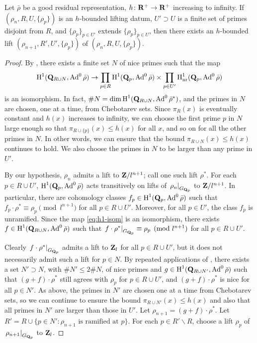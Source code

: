 \begin{theorem}\label{thm:lifting-datum}
Let $\bar\rho$ be a good residual representation, $h\colon \mathbf{R}^+ \to \mathbf{R}^+$ 
increasing to infinity. If $(\rho_n,R,U,\{\rho_p\})$ is an $h$-bounded lifting 
datum, $U'\supset U$ is a finite set of primes disjoint from $R$, and 
$\{\rho_p\}_{p\in U'}$ extends $\{\rho_p\}_{p\in U}$, then there exists an 
$h$-bounded lift $(\rho_{n+1},R',U',\{\rho_p\})$ of 
$(\rho_n,R,U,\{\rho_p\})$. 
\end{theorem}
\begin{proof}
By \cite[Lem.~8]{khare-larsen-ramakrishna-2005}, there exists a finite set 
$N$ of nice primes such that the map 
\begin{equation}\label{eq:h1-isom}
	\operatorname{H}^1(\mathbf{Q}_{R\cup N},\operatorname{Ad}^0\bar\rho) \to \prod_{p\in R} \operatorname{H}^1(\mathbf{Q}_p,\operatorname{Ad}^0\bar\rho) \times \prod_{p\in U'} \operatorname{H}_{\mathrm{nr}}^1(\mathbf{Q}_p,\operatorname{Ad}^0\bar\rho) 
\end{equation}
is an isomorphism. In fact, 
$\# N = \dim\operatorname{H}^1(\mathbf{Q}_{R\cup N},\operatorname{Ad}^0\bar\rho^\ast)$, and the primes in $N$ are 
chosen, one at a time, from Chebotarev sets. Since $\pi_R(x)$ is eventually 
constant and $h(x)$ increases to infinity, we can choose the first prime $p$ in 
$N$ large enough so that $\pi_{R\cup\{p\}}(x) \leqslant h(x)$ for all $x$, and 
so on for all the other primes in $N$. In other words, we can ensure that the 
bound $\pi_{R\cup N}(x) \leqslant h(x)$ continues to hold. We also choose the 
primes in $N$ to be larger than any prime in $U'$. 

By our hypothesis, $\rho_n$ admits a lift to $\mathbf{Z}/l^{n+1}$; call one such lift 
$\rho^\ast$. For each $p\in R\cup U'$, $\operatorname{H}^1(\mathbf{Q}_p,\operatorname{Ad}^0\bar\rho)$ acts 
transitively on lifts of $\left.\rho_n\right|_{G_{\mathbf{Q}_p}}$ to $\mathbf{Z}/l^{n+1}$. In 
particular, there are cohomology classes $f_p\in \operatorname{H}^1(\mathbf{Q}_p,\operatorname{Ad}^0\bar\rho)$ 
such that $f_p\cdot \rho^\ast \equiv \rho_p\pmod{l^{n+1}}$ for all 
$p\in R\cup U'$. Moreover, for all $p\in U'$, the class $f_p$ is unramified. 
Since the map \eqref{eq:h1-isom} is an isomorphism, there exists 
$f\in \operatorname{H}^1(\mathbf{Q}_{R\cup N},\operatorname{Ad}^0\bar\rho)$ such that 
$\left.f\cdot \rho^\ast\right|_{G_{\mathbf{Q}_p}}\equiv \rho_p\pmod{l^{n+1}}$ for all 
$p\in R\cup U'$. 

Clearly $\left. f\cdot \rho^\ast\right|_{G_{\mathbf{Q}_p}}$ admits a lift to $\mathbf{Z}_l$ 
for all $p\in R\cup U'$, but it does not necessarily admit such a lift for 
$p\in N$. By repeated applications of \cite[Prop.~3.10]{pande-2011}, there 
exists a set $N'\supset N$, with $\# N'\leqslant 2\# N$, of nice primes and 
$g\in \operatorname{H}^1(\mathbf{Q}_{R\cup N'},\operatorname{Ad}^0\bar\rho)$ such that 
$(g+f)\cdot \rho^\ast$ still agrees with $\rho_p$ for $p\in R\cup U'$, and 
$(g+f)\cdot \rho^\ast$ is nice for all $p\in N'$. As above, the primes in $N'$ 
are chosen one at a time from Chebotarev sets, so we can continue to ensure the 
bound $\pi_{R\cup N'}(x)\leqslant h(x)$ and also that all primes in $N'$ 
are larger than those in $U'$. Let $\rho_{n+1} = (g+f) \cdot \rho^\ast$. Let 
$R' = R\cup \{p\in N' : \rho_{n+1}\text{ is ramified at }p\}$. For each 
$p\in R'\smallsetminus R$, choose a lift $\rho_p$ of 
$\left. \rho_{n+1}\right|_{G_{\mathbf{Q}_p}}$ to $\mathbf{Z}_l$. 


\end{proof}
